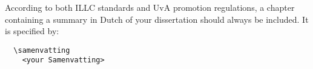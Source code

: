 \samenvatting
According to both ILLC standards and UvA promotion regulations,
a chapter containing a summary in
Dutch of your dissertation should always be included.
It is specified by:
\begin{verbatim}
  \samenvatting
    <your Samenvatting>
\end{verbatim}
